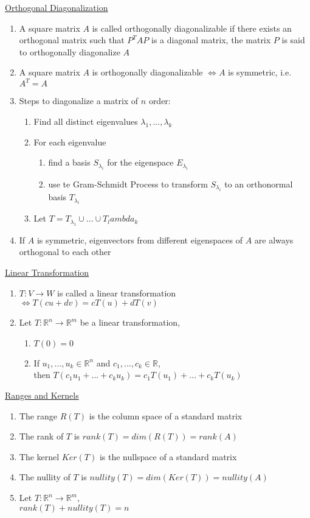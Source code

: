 \documentclass[a4paper,1pt,landscape]{article}
\begin{document}
\begin{multicols}{3}
\underline{Orthogonal Diagonalization}
\begin{enumerate}
    \item A square matrix $A$ is called orthogonally diagonalizable if there exists an orthogonal matrix such that $P^TAP$ is a diagonal matrix, the matrix $P$ is said to orthogonally diagonalize $A$
    \item A square matrix $A$ is orthogonally diagonalizable $\Leftrightarrow A$ is symmetric, i.e. $A^T = A$
    \item Steps to diagonalize a matrix of $n$ order: \begin{enumerate}
        \item Find all distinct eigenvalues $\lambda_1, ..., \lambda_k$
        \item For each eigenvalue \begin{enumerate}
            \item find a basis $S_\lambda_i$ for the eigenspace $E_\lambda_i$
            \item use te Gram-Schmidt Process to transform $S_\lambda_i$ to an orthonormal basis $T_\lambda_i$
        \end{enumerate}
        \item Let $T = T_\lambda_1 \cup ... \cup T_lambda_k$ 
    \end{enumerate}
    \item If $A$ is symmetric, eigenvectors from different eigenspaces of $A$ are always orthogonal to each other
\end{enumerate}

\underline{Linear Transformation}
\begin{enumerate}
    \item $T: V \rightarrow W$ is called a linear transformation $\Leftrightarrow T(cu + dv) = cT(u) + dT(v)$
    \item Let $T: \mathbb{R}^n \rightarrow \mathbb{R}^m$ be a linear transformation, \\
    \begin{enumerate}
        \item $T(0) = 0$
        \item If $u_1, ..., u_k \in \mathbb{R}^n$ and $c_1, ..., c_k \in \mathbb{R}$, \\
        then $T(c_1u_1 + ... + c_ku_k) = c_1T(u_1) + ... + c_kT(u_k)$
    \end{enumerate}
\end{enumerate}

\underline{Ranges and Kernels}
\begin{enumerate}
    \item The range $R(T)$ is the column space of a standard matrix
    \item The rank of $T$ is $rank(T) = dim(R(T)) = rank(A)$
    \item The kernel $Ker(T)$ is the nullspace of a standard matrix
    \item The nullity of $T$ is $nullity(T) = dim(Ker(T)) = nullity(A)$
    \item Let $T: \mathbb{R}^n \rightarrow \mathbb{R}^m$, \\
    $rank(T) + nullity(T) = n$
\end{enumerate}


\end{multicols}
\end{document}
